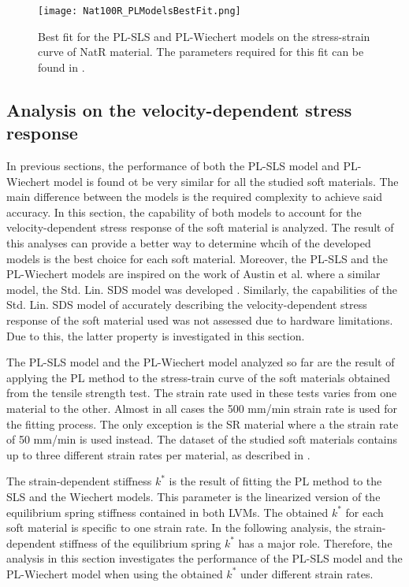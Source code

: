 \begin{figure}[H]
	\centering
	\texttt{[image: Nat100R\_PLModelsBestFit.png]}
	\caption{Best fit for the PL-SLS and PL-Wiechert models on the stress-strain curve of NatR material. The parameters required for this fit can be found in .}
	\label{fig:BestFitNat100R}
\end{figure}


\subsection{Analysis on the velocity-dependent stress response} \label{VelocityAnalysis}

In previous sections, the performance of both the PL-SLS model and PL-Wiechert model is found ot be very similar for all the studied soft materials. The main difference between the models is the required complexity to achieve said accuracy. In this section, the capability of both models to account for the velocity-dependent stress response of the soft material is analyzed. The result of this analyses can provide a better way to determine whcih of the developed models is the best choice for each soft material. Moreover, the PL-SLS and the PL-Wiechert models are inspired on the work of Austin et al. where a similar model, the Std. Lin. SDS model was developed \cite{austin2015control}. Similarly, the capabilities of the Std. Lin. SDS model of accurately describing the velocity-dependent stress response of the soft material used was not assessed due to hardware limitations. Due to this, the latter property is investigated in this section. 

The PL-SLS model and the PL-Wiechert model analyzed so far are the result of applying the PL method to the stress-train curve of the soft materials obtained from the tensile strength test. The strain rate used in these tests varies from one material to the other. Almost in all cases the 500 mm/min strain rate is used for the fitting process. The only exception is the SR material where a the strain rate of 50 mm/min is used instead. The dataset of the studied soft materials contains up to three different strain rates per material, as described in . 

The strain-dependent stiffness $k^*$ is the result of fitting the PL method to the SLS and the Wiechert models. This parameter is the linearized version of the equilibrium spring stiffness contained in both LVMs. The obtained $k^*$ for each soft material is specific to one strain rate. In the following analysis, the strain-dependent stiffness of the equilibrium spring $k^*$ has a major role. Therefore, the analysis in this section investigates the performance of the PL-SLS model and the PL-Wiechert model when using the obtained $k^*$ under different strain rates.

